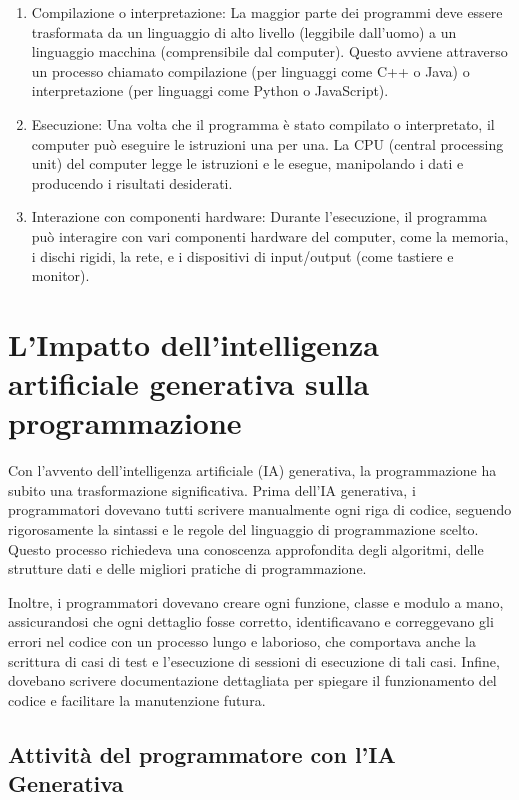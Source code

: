 \documentclass[
  letterpaper,
  DIV=11,
  numbers=noendperiod]{scrreprt}
\providecommand{\tightlist}{%
  \setlength{\itemsep}{0pt}\setlength{\parskip}{0pt}}\usepackage{longtable,booktabs,array}
\begin{document}
\begin{enumerate}
\def\labelenumi{\arabic{enumi}.}
\tightlist
\item
  Compilazione o interpretazione: La maggior parte dei programmi deve
  essere trasformata da un linguaggio di alto livello (leggibile
  dall'uomo) a un linguaggio macchina (comprensibile dal computer).
  Questo avviene attraverso un processo chiamato compilazione (per
  linguaggi come C++ o Java) o interpretazione (per linguaggi come
  Python o JavaScript).
\item
  Esecuzione: Una volta che il programma è stato compilato o
  interpretato, il computer può eseguire le istruzioni una per una. La
  CPU (central processing unit) del computer legge le istruzioni e le
  esegue, manipolando i dati e producendo i risultati desiderati.
\item
  Interazione con componenti hardware: Durante l'esecuzione, il
  programma può interagire con vari componenti hardware del computer,
  come la memoria, i dischi rigidi, la rete, e i dispositivi di
  input/output (come tastiere e monitor).
\end{enumerate}

\section{L'Impatto dell'intelligenza artificiale generativa sulla
programmazione}\label{limpatto-dellintelligenza-artificiale-generativa-sulla-programmazione}

Con l'avvento dell'intelligenza artificiale (IA) generativa, la
programmazione ha subito una trasformazione significativa. Prima dell'IA
generativa, i programmatori dovevano tutti scrivere manualmente ogni
riga di codice, seguendo rigorosamente la sintassi e le regole del
linguaggio di programmazione scelto. Questo processo richiedeva una
conoscenza approfondita degli algoritmi, delle strutture dati e delle
migliori pratiche di programmazione.

Inoltre, i programmatori dovevano creare ogni funzione, classe e modulo
a mano, assicurandosi che ogni dettaglio fosse corretto, identificavano
e correggevano gli errori nel codice con un processo lungo e laborioso,
che comportava anche la scrittura di casi di test e l'esecuzione di
sessioni di esecuzione di tali casi. Infine, dovebano scrivere
documentazione dettagliata per spiegare il funzionamento del codice e
facilitare la manutenzione futura.

\subsection{Attività del programmatore con l'IA
Generativa}\label{attivituxe0-del-programmatore-con-lia-generativa}
\end{document}
